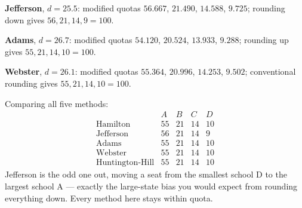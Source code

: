 \documentclass[12pt]{ximera}
\begin{document}
\begin{problem}
\begin{prompt}
\begin{feedback}
\textbf{Jefferson}, $d = 25.5$: modified quotas $56.667$, $21.490$, $14.588$, $9.725$;
rounding down gives $56, 21, 14, 9 = 100$. \checkmark

\textbf{Adams}, $d = 26.7$: modified quotas $54.120$, $20.524$, $13.933$, $9.288$;
rounding up gives $55, 21, 14, 10 = 100$. \checkmark

\textbf{Webster}, $d = 26.1$: modified quotas $55.364$, $20.996$, $14.253$, $9.502$;
conventional rounding gives $55, 21, 14, 10 = 100$. \checkmark

Comparing all five methods:
\[
\begin{array}{lcccc}
 & A & B & C & D\\
\text{Hamilton} & 55 & 21 & 14 & 10\\
\text{Jefferson} & 56 & 21 & 14 & 9\\
\text{Adams} & 55 & 21 & 14 & 10\\
\text{Webster} & 55 & 21 & 14 & 10\\
\text{Huntington-Hill} & 55 & 21 & 14 & 10
\end{array}
\]
Jefferson is the odd one out, moving a seat from the smallest school D to the largest
school A --- exactly the large-state bias you would expect from rounding everything down.
Every method here stays within quota.
\end{feedback}
\end{prompt}
\end{problem}
\end{document}
